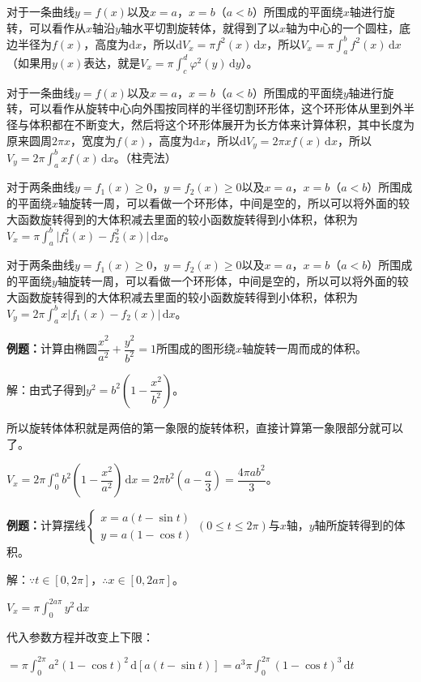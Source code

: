 \documentclass[UTF8, 12pt]{ctexart}
\begin{document}
对于一条曲线$y=f(x)$以及$x=a$，$x=b$（$a<b$）所围成的平面绕$x$轴进行旋转，可以看作从$x$轴沿$y$轴水平切割旋转体，就得到了以$x$轴为中心的一个圆柱，底边半径为$f(x)$，高度为$\textrm{d}x$，所以$\textrm{d}V_x=\pi f^2(x)\,\textrm{d}x$，所以$V_x=\pi\int_a^bf^2(x)\,\textrm{d}x$（如果用$y(x)$表达，就是$V_x=\pi\int_c^d\varphi^2(y)\,\textrm{d}y$）。

对于一条曲线$y=f(x)$以及$x=a$，$x=b$（$a<b$）所围成的平面绕$y$轴进行旋转，可以看作从旋转中心向外围按同样的半径切割环形体，这个环形体从里到外半径与体积都在不断变大，然后将这个环形体展开为长方体来计算体积，其中长度为原来圆周$2\pi x$，宽度为$f(x)$，高度为$\textrm{d}x$，所以$\textrm{d}V_y=2\pi xf(x)\,\textrm{d}x$，所以$V_y=2\pi\int_a^bxf(x)\,\textrm{d}x$。（柱壳法）

对于两条曲线$y=f_1(x)\geqslant0$，$y=f_2(x)\geqslant0$以及$x=a$，$x=b$（$a<b$）所围成的平面绕$x$轴旋转一周，可以看做一个环形体，中间是空的，所以可以将外面的较大函数旋转得到的大体积减去里面的较小函数旋转得到小体积，体积为$V_x=\pi\int_a^b\vert f_1^2(x)-f_2^2(x)\vert\,\textrm{d}x$。

对于两条曲线$y=f_1(x)\geqslant0$，$y=f_2(x)\geqslant0$以及$x=a$，$x=b$（$a<b$）所围成的平面绕$y$轴旋转一周，可以看做一个环形体，中间是空的，所以可以将外面的较大函数旋转得到的大体积减去里面的较小函数旋转得到小体积，体积为$V_y=2\pi\int_a^bx\vert f_1(x)-f_2(x)\vert\,\textrm{d}x$。

\textbf{例题：}计算由椭圆$\dfrac{x^2}{a^2}+\dfrac{y^2}{b^2}=1$所围成的图形绕$x$轴旋转一周而成的体积。

解：由式子得到$y^2=b^2\left(1-\dfrac{x^2}{b^2}\right)$。

所以旋转体体积就是两倍的第一象限的旋转体积，直接计算第一象限部分就可以了。

$V_x=2\pi\displaystyle{\int_0^ab^2\left(1-\dfrac{x^2}{a^2}\right)\,\textrm{d}x}=2\pi b^2\left(a-\dfrac{a}{3}\right)=\dfrac{4\pi ab^2}{3}$。

\textbf{例题：}计算摆线$\left\{\begin{array}{l}
    x=a(t-\sin t) \\
    y=a(1-\cos t)
\end{array}
\right.$$(0\leqslant t\leqslant 2\pi)$与$x$轴，$y$轴所旋转得到的体积。

解：$\because t\in[0,2\pi]$，$\therefore x\in[0,2a\pi]$。

$V_x=\pi\int_0^{2a\pi}y^2\,\textrm{d}x$

代入参数方程并改变上下限：

$=\pi\int_0^{2\pi}a^2(1-\cos t)^2\,\textrm{d}[a(t-\sin t)]=a^3\pi\int_0^{2\pi}(1-\cos t)^3\,\textrm{d}t$
\end{document}
